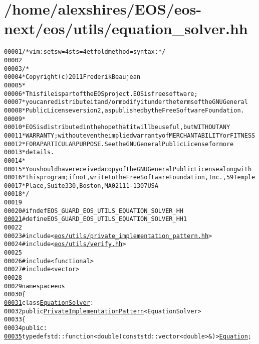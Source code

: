 \hypertarget{equation__solver_8hh_source}{
\section{/home/alexshires/EOS/eos-\/next/eos/utils/equation\_\-solver.hh}
}


\begin{footnotesize}\begin{alltt}
00001 \textcolor{comment}{/* vim: set sw=4 sts=4 et foldmethod=syntax : */}
00002 
00003 \textcolor{comment}{/*}
00004 \textcolor{comment}{ * Copyright (c) 2011 Frederik Beaujean}
00005 \textcolor{comment}{ *}
00006 \textcolor{comment}{ * This file is part of the EOS project. EOS is free software;}
00007 \textcolor{comment}{ * you can redistribute it and/or modify it under the terms of the GNU General}
00008 \textcolor{comment}{ * Public License version 2, as published by the Free Software Foundation.}
00009 \textcolor{comment}{ *}
00010 \textcolor{comment}{ * EOS is distributed in the hope that it will be useful, but WITHOUT ANY}
00011 \textcolor{comment}{ * WARRANTY; without even the implied warranty of MERCHANTABILITY or FITNESS}
00012 \textcolor{comment}{ * FOR A PARTICULAR PURPOSE.  See the GNU General Public License for more}
00013 \textcolor{comment}{ * details.}
00014 \textcolor{comment}{ *}
00015 \textcolor{comment}{ * You should have received a copy of the GNU General Public License along with}
00016 \textcolor{comment}{ * this program; if not, write to the Free Software Foundation, Inc., 59 Temple}
00017 \textcolor{comment}{ * Place, Suite 330, Boston, MA  02111-1307  USA}
00018 \textcolor{comment}{ */}
00019 
00020 \textcolor{preprocessor}{#ifndef EOS\_GUARD\_EOS\_UTILS\_EQUATION\_SOLVER\_HH}
\hypertarget{equation__solver_8hh_source_l00021}{}\hyperlink{equation__solver_8hh_ac6e4af9e53b8a73b6f7b03ad0c6fdb93}{00021} \textcolor{preprocessor}{}\textcolor{preprocessor}{#define EOS\_GUARD\_EOS\_UTILS\_EQUATION\_SOLVER\_HH 1}
00022 \textcolor{preprocessor}{}
00023 \textcolor{preprocessor}{#include <\hyperlink{private__implementation__pattern_8hh}{eos/utils/private_implementation_pattern.hh}>}
00024 \textcolor{preprocessor}{#include <\hyperlink{verify_8hh}{eos/utils/verify.hh}>}
00025 
00026 \textcolor{preprocessor}{#include <functional>}
00027 \textcolor{preprocessor}{#include <vector>}
00028 
00029 \textcolor{keyword}{namespace }eos
00030 \{
\hypertarget{equation__solver_8hh_source_l00031}{}\hyperlink{classeos_1_1EquationSolver}{00031}     \textcolor{keyword}{class }\hyperlink{classeos_1_1EquationSolver}{EquationSolver} :
00032         \textcolor{keyword}{public} \hyperlink{classeos_1_1PrivateImplementationPattern}{PrivateImplementationPattern}<EquationSolver>
00033     \{
00034         \textcolor{keyword}{public}:
\hypertarget{equation__solver_8hh_source_l00035}{}\hyperlink{classeos_1_1EquationSolver_a7394803ea85312852151a700b59da572}{00035}             \textcolor{keyword}{typedef} std::function<double (const std::vector<double> &)> \hyperlink{classeos_1_1EquationSolver_a7394803ea85312852151a700b59da572}{Equation};
      

\end{alltt}
\end{footnotesize}
